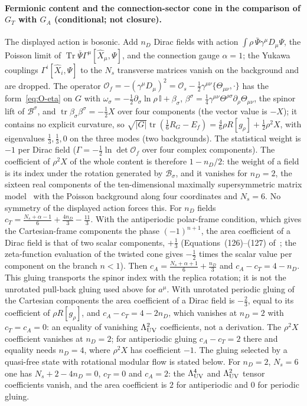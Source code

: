 \paragraph{Fermionic content and the connection-sector cone in the comparison of \(G_T\) with \(G_A\) (conditional; not closure).}
The displayed action is bosonic. Add \(n_D\) Dirac fields with action \(\int\rho\,\bar\Psi\gamma^\mu D_\mu\Psi\), the Poisson limit of \(\operatorname{Tr}\bar\Psi\Gamma^\mu[\hat X_\mu,\Psi]\), and the connection gauge \(\alpha=1\); the Yukawa couplings \(\Gamma^i[\hat X_i,\Psi]\) to the \(N_s\) transverse matrices vanish on the background and are dropped. The operator \(\mathcal O_f=-(\gamma^\mu D_\mu)^2=\mathcal O_s-\tfrac12\gamma^{\mu\nu}\{\Theta_{\mu\nu},\cdot\}\) has the form~\eqref{eq:O-eta} on \(G\) with \(\omega_\sigma=-\tfrac12\partial_\sigma\ln\rho\,\mathbb I+\beta_\sigma\), \(\beta^\sigma=\tfrac14\gamma^{\mu\nu}\Theta^{\rho\sigma}\partial_\rho\Theta_{\mu\nu}\), the spinor lift of \(\mathcal B^\sigma\), and \(\operatorname{tr}\beta_\sigma\beta^\sigma=-\tfrac12X\) over four components (the vector value is \(-X\)); it contains no explicit curvature, so \(\sqrt{|G|}\operatorname{tr}(\tfrac16R_G-E_f)=\tfrac46\rho R[g_\rho]+\tfrac12\rho^2X\), with eigenvalues \(\tfrac13,\tfrac13,0\) on the three modes (two backgrounds). The statistical weight is \(-1\) per Dirac field (\(\Gamma=-\tfrac12\ln\det\mathcal O_f\) over four complex components). The coefficient of \(\rho^2X\) of the whole content is therefore \(1-n_D/2\): the weight of a field is its index under the rotation generated by \(\mathcal B_\sigma\), and it vanishes for \(n_D=2\), the sixteen real components of the ten-dimensional maximally supersymmetric matrix model~\cite{IKKT1997} with the Poisson background along four coordinates and \(N_s=6\). No symmetry of the displayed action forces this. For \(n_D\) fields \(c_T=\tfrac{N_s+\alpha-1}6+\tfrac{4n_D}3-\tfrac{11}3\). With the antiperiodic polar-frame condition, which gives the Cartesian-frame components the phase \((-1)^{n+1}\), the area coefficient of a Dirac field is that of two scalar components, \(+\tfrac13\) (Equations~(126)--(127) of~\cite{Solodukhin2011}; the zeta-function evaluation of the twisted cone gives \(-\tfrac12\) times the scalar value per component on the branch \(n<1\)). Then \(c_A=\tfrac{N_s+\alpha+1}6+\tfrac{n_D}3\) and \(c_A-c_T=4-n_D\). This gluing transports the spinor index with the replica rotation; it is not the unrotated pull-back gluing used above for \(a^\mu\). With unrotated periodic gluing of the Cartesian components the area coefficient of a Dirac field is \(-\tfrac23\), equal to its coefficient of \(\rho R[g_\rho]\), and \(c_A-c_T=4-2n_D\), which vanishes at \(n_D=2\) with \(c_T=c_A=0\): an equality of vanishing \(\Lambda_{\mathrm{UV}}^2\) coefficients, not a derivation. The \(\rho^2X\) coefficient vanishes at \(n_D=2\); for antiperiodic gluing \(c_A-c_T=2\) there and equality needs \(n_D=4\), where \(\rho^2X\) has coefficient \(-1\). The gluing selected by a quasi-free state with rotational modular flow is stated below. For \(n_D=2\), \(N_s=6\) one has \(N_s+2-4n_D=0\), \(c_T=0\) and \(c_A=2\): the \(\Lambda_{\mathrm{UV}}^4\) and \(\Lambda_{\mathrm{UV}}^2\) tensor coefficients vanish, and the area coefficient is \(2\) for antiperiodic and \(0\) for periodic gluing.


